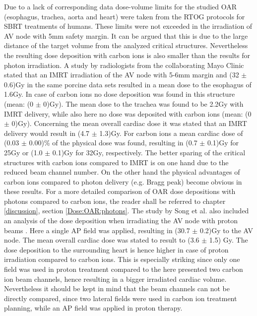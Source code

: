 \documentclass[type=dr, dr=rernat, accentcolor=tud7b,colorbacktitle, bigchapter, openright, twoside, 12pt ]{tudthesis}
\begin{document}
Due to a lack of corresponding data dose-volume limits for the studied OAR (esophagus, trachea, aorta and heart) were taken from the RTOG 
protocols for SBRT treatments of humans. These limits were not exceeded in the irradiation of AV node with 5mm safety margin. 
It can be argued that this is due to the large distance of the target volume from the analyzed critical structures. Nevertheless the resulting 
dose deposition with carbon ions is also smaller than the results for photon irradiation. A study by radiologists from the collaborating 
Mayo Clinic \cite{Son14} stated that an IMRT irradiation of the AV node with 5-6mm margin and (32 $\pm$ 0.6)Gy in the same porcine data sets 
resulted in a mean dose to the esophagus of 1.6Gy. In case of carbon ions no dose deposition was found in this structure (mean: (0 $\pm$ 0)Gy). 
The mean dose to the trachea was found to be 2.2Gy with IMRT delivery, while also here no dose was deposited with carbon ions (mean: (0 $\pm$ 0)Gy). 
Concerning the mean overall cardiac dose it was stated that an IMRT delivery would result in (4.7 $\pm$ 1.3)Gy. For carbon ions a mean 
cardiac dose of (0.03 $\pm$ 0.00)\% of the physical dose was found, resulting in (0.7 $\pm$ 0.1)Gy for 25Gy or (1.0 $\pm$ 0.1)Gy for 32Gy, respectively. 
The better sparing of the critical structures with carbon ions compared to IMRT is on one hand due to the reduced beam channel number. 
On the other hand the physical advantages of carbon ions compared to photon delivery (e.g. Bragg peak) become obvious in these results. 
For a more detailed comparison of OAR dose depositions with photons compared to carbon ions, the reader shall be referred to chapter 
\ref{discussion}, section \ref{Dose:OAR:photons}. 
The study by Song et al. also included an analysis of the dose deposition when irradiating the AV node with proton beams \cite{Son14}. Here a 
single AP field was applied, resulting in (30.7 $\pm$ 0.2)Gy to the AV node. The mean overall cardiac dose was stated to result to (3.6 $\pm$ 1.5) Gy. 
The dose deposition to the surrounding heart is hence higher in case of proton irradiation compared to carbon ions. This is especially striking 
since only one field was used in proton treatment compared to the here presented two carbon ion beam channels, hence resulting in a bigger 
irradiated cardiac volume. Nevertheless it should be kept in mind that the beam channels can not be directly compared, since two lateral 
fields were used in carbon ion treatment planning, while an AP field was applied in proton therapy.\newline
\newline
\end{document}
